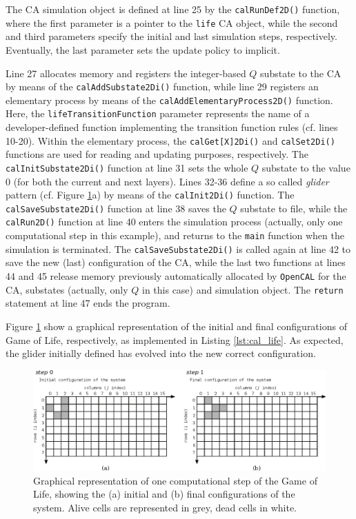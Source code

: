 The CA simulation object is defined at line 25 by the
\verb'calRunDef2D()' function, where the first parameter is a
pointer to the \verb'life' CA object, while the second and third
parameters specify the initial and last simulation steps,
respectively. Eventually, the last parameter sets the update
policy to implicit.

Line 27 allocates memory and registers the integer-based $Q$
substate to the CA by means of the \verb'calAddSubstate2Di()'
function, while line 29 registers an elementary process by means
of the \verb'calAddElementaryProcess2D()' function. Here, the
\verb'lifeTransitionFunction' parameter represents the name of a
developer-defined function implementing the transition function
rules (cf. lines 10-20). Within the elementary process, the
\verb'calGet[X]2Di()' and \verb'calSet2Di()' functions are used
for reading and updating purposes, respectively. The
\verb'calInitSubstate2Di()' function at line 31 sets the whole $Q$
substate to the value 0 (for both the current and next
layers). Lines 32-36 define a so called \emph{glider} pattern
(cf. Figure \ref{fig:cal_life_glut}a) by means of the
\verb'calInit2Di()' function. The \verb'calSaveSubstate2Di()'
function at line 38 saves the $Q$ substate to file, while the
\verb'calRun2D()' function at line 40 enters the simulation
process (actually, only one computational step in this example),
and returns to the \verb'main' function when the simulation is
terminated. The \verb'calSaveSubstate2Di()' is called again at
line 42 to save the new (last) configuration of the CA, while the
last two functions at lines 44 and 45 release memory previously
automatically allocated by \texttt{OpenCAL} for the CA, substates
(actually, only $Q$ in this case) and simulation object. The
\verb'return' statement at line 47 ends the program.

Figure \ref{fig:cal_life_glut} show a graphical representation of
the initial and final configurations of Game of Life,
respectively, as implemented in Listing \ref{lst:cal_life}. As
expected, the glider initially defined has evolved into the new
correct configuration.

  \begin{figure}
	\begin{center}
		\includegraphics[width=1.0\textwidth]{./images/opencal/Figure04_new}
		\caption{Graphical representation of one computational step of
			the Game of Life, showing the (a) initial and (b) final
			configurations of the system. Alive cells are represented in
			grey, dead cells in white.}
		\label{fig:cal_life_glut}
	\end{center}
\end{figure}

